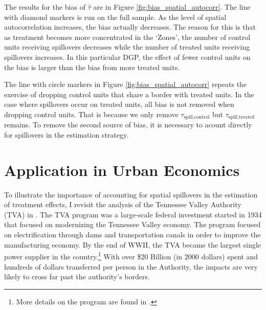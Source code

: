 \documentclass[11pt]{article}
\begin{document}
The results for the bias of $\hat{\tau}$ are in Figure \ref{fig:bias_spatial_autocorr}. The line with diamond markers is run on the full sample. As the level of spatial autocorrelation increases, the bias actually decreases. The reason for this is that as treatment becomes more concentrated in the `Zones', the number of control units receiving spillovers decreases while the number of treated units receiving spillovers increases. In this particular DGP, the effect of fewer control units on the bias is larger than the bias from more treated units. 

The line with circle markers in Figure \ref{fig:bias_spatial_autocorr} repeats the exercise of dropping control units that share a border with treated units. In the case where spillovers occur on treated units, all bias is not removed when dropping control units. That is because we only remove $\tau_{\text{spill,control}}$ but $\tau_{\text{spill,treated}}$ remains. To remove the second source of bias, it is necessary to acount directly for spillovers in the estimation strategy. 






\section{Application in Urban Economics}
\label{sec:tva}

To illustrate the importance of accounting for spatial spillovers in the estimation of treatment effects, I revisit the analysis of the Tennessee Valley Authority (TVA) in \citet{Kline_Moretti_2014}. The TVA program was a large-scale federal investment started in 1934 that focused on modernizing the Tennessee Valley economy. The program focused on electrification through dams and transportation canals in order to improve the manufacturing economy. By the end of WWII, the TVA became the largest single power supplier in the country.\footnote{More details on the program are found in \citet{Kline_Moretti_2014}.} With over \$20 Billion (in 2000 dollars) spent and hundreds of dollars transferred per person in the Authority, the impacts are very likely to cross far past the authority's borders. 
\end{document}
